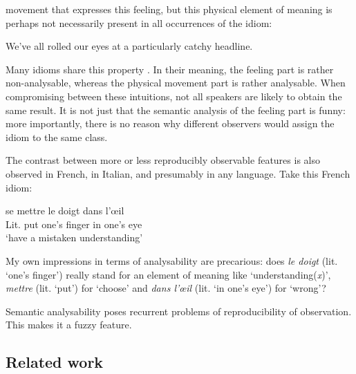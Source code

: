 \documentclass[output=paper]{langsci/langscibook}
\begin{document}
movement that expresses this feeling, but this physical element of meaning is perhaps not necessarily present in all occurrences of the idiom:


\begin{exe}
\ex \label{ex:6:33} 
We’ve all rolled our eyes at a particularly catchy headline.
\end{exe}

\noindent Many idioms share this property \citep[44]{Burger1998}. In their meaning, the feeling part is rather non-analysable, whereas the physical movement part is rather analysable. When compromising between these intuitions, not all speakers are likely to obtain the same result. It is not just that the semantic analysis of the feeling part is funny: more importantly, there is no reason why different observers would assign the idiom to the same class.

The contrast between more or less reproducibly observable features is also observed in French, in Italian, and presumably in any language. Take this French idiom:

\begin{exe}
\ex \label{ex:6:34} 
se mettre le doigt dans l’œil\\
Lit. put one’s finger in {one’s eye}\\
‘have a mistaken understanding’
\end{exe}

\noindent My own impressions in terms of analysability are precarious: does \textit{le doigt} (lit. `one’s finger') really stand for an element of meaning like ‘understanding(\textit{x})’, \textit{mettre} (lit. `put') for ‘choose’ and \textit{dans l’œil} (lit. `in one’s eye') for ‘wrong’?

Semantic analysability poses recurrent problems of reproducibility of observation. This makes it a fuzzy feature.

\subsection{Related work}
\end{document}

